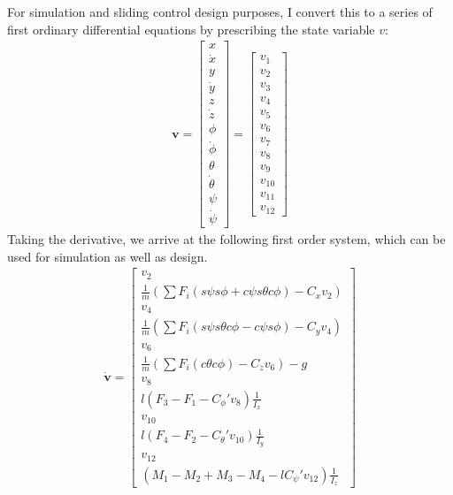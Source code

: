 \documentclass[conference]{IEEEtran}
\newcommand{\cphi}{c\phi}
\newcommand{\cth}{c\theta}
\newcommand{\cpsi}{c\psi}
\newcommand{\sphi}{s\phi}
\newcommand{\sth}{s\theta}
\newcommand{\spsi}{s\psi}
\begin{document}
For simulation and sliding control design purposes, I convert this to a series of first ordinary differential equations by prescribing the state variable $v$:
\begin{align*}
\mathbf{v} = \begin{bmatrix} x \\ \dot{x} \\ y \\ \dot{y} \\ z \\ \dot{z} \\ \phi \\ \dot{\phi} \\ \theta \\ \dot{\theta} \\ \psi \\ \dot{\psi} \end{bmatrix} =
\begin{bmatrix} v_1 \\ v_2 \\ v_3 \\ v_4 \\ v_5 \\ v_6 \\ v_7 \\ v_8 \\ v_9 \\ v_{10} \\ v_{11} \\ v_{12}\end{bmatrix}
\end{align*}
Taking the derivative, we arrive at the following first order system, which can be used for simulation as well as design.
\begin{align*}
\dot{\mathbf{v}} = \begin{bmatrix}
v_2 \\
\frac{1}{m}(\sum F_i (\spsi\sphi + \cpsi\sth\cphi) - C_xv_2) \\
v_4 \\
\frac{1}{m}(\sum F_i (\spsi\sth\cphi - \cpsi\sphi)  - C_yv_4)\\
v_6 \\
\frac{1}{m}(\sum F_i (\cth\cphi) - C_zv_6) - g \\
v_8 \\
l(F_3 - F_1 - C_\phi'v_8)\frac{1}{I_x} \\
v_{10} \\
l(F_4 - F_2 - C_\theta'v_{10})\frac{1}{I_y} \\
v_{12} \\
(M_1 - M_2 + M_3 - M_4 - lC_\psi'v_{12})\frac{1}{I_z}
\end{bmatrix}
\end{align*}
\end{document}
